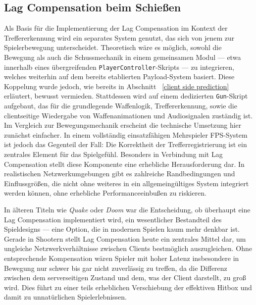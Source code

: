 \begin{enumerate}
\section{Lag Compensation beim Schießen}
Als Basis für die Implementierung der Lag Compensation im Kontext der Treffererkennung wird ein separates System genutzt, das sich von jenem zur Spielerbewegung unterscheidet. Theoretisch wäre es möglich, sowohl die Bewegung als auch die Schussmechanik in einem gemeinsamen Modul — etwa innerhalb eines übergreifenden \texttt{PlayerController}-Skripts — zu integrieren, welches weiterhin auf dem bereits etablierten Payload-System basiert. Diese Koppelung wurde jedoch, wie bereits in Abschnitt~ \ref{client side prediction} erläutert, bewusst vermieden.
Stattdessen wird auf einem dedizierten \texttt{Gun}-Skript aufgebaut, das für die grundlegende Waffenlogik, Treffererkennung, sowie die clientseitige Wiedergabe von Waffenanimationen und Audiosignalen zuständig ist.
Im Vergleich zur Bewegungsmechanik erscheint die technische Umsetzung hier zunächst einfacher. In einem vollständig einsatzfähigen Mehrspieler FPS-System ist jedoch das Gegenteil der Fall: Die Korrektheit der Trefferregistrierung ist ein zentrales Element für das Spielgefühl. Besonders in Verbindung mit Lag Compensation stellt diese Komponente eine erhebliche Herausforderung dar. In realistischen Netzwerkumgebungen gibt es zahlreiche Randbedingungen und Einflussgrößen, die nicht ohne weiteres in ein allgemeingültiges System integriert werden können, ohne erhebliche Performanceeinbußen zu riskieren.

In älteren Titeln wie \textit{Quake} oder \textit{Doom} war die Entscheidung, ob überhaupt eine Lag Compensation implementiert wird, ein wesentlicher Bestandteil des Spieldesigns — eine Option, die in modernen Spielen kaum mehr denkbar ist. Gerade in Shootern stellt Lag Compensation heute ein zentrales Mittel dar, um ungleiche Netzwerkverhältnisse zwischen Clients bestmöglich auszugleichen.
Ohne entsprechende Kompensation wären Spieler mit hoher Latenz insbesondere in Bewegung nur schwer bis gar nicht zuverlässig zu treffen, da die Differenz zwischen dem serverseitigen Zustand und dem, was der Client darstellt, zu groß wird. Dies führt zu einer teils erheblichen Verschiebung der effektiven Hitbox und damit zu unnatürlichen Spielerlebnissen.
\newpage


\end{enumerate}

